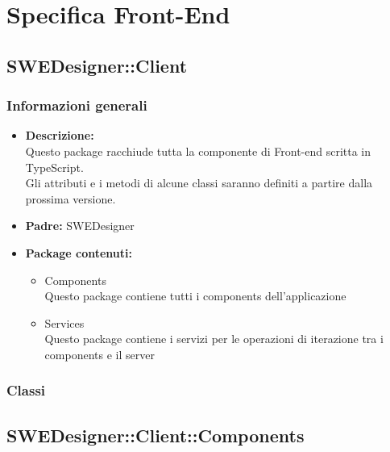 \section{Specifica Front-End}
	\subsection{SWEDesigner::Client}
		\subsubsection{Informazioni generali}
			\begin{itemize}
          		\item \textbf{Descrizione:}\\
          		Questo package racchiude tutta la componente di Front-end scritta in TypeScript.\\
          		Gli attributi e i metodi di alcune classi saranno definiti a partire dalla prossima versione.
          		\item \textbf{Padre:} SWEDesigner
          		\item \textbf{Package contenuti:}\\
          		\begin{itemize}
          			\item Components\\
          			Questo package contiene tutti i components dell’applicazione
          			\item Services\\
          			Questo package contiene i servizi per le operazioni di iterazione tra i components e
il server
          		\end{itemize}
          	\end{itemize}
		\subsubsection{Classi}
	\subsection{SWEDesigner::Client::Components}
